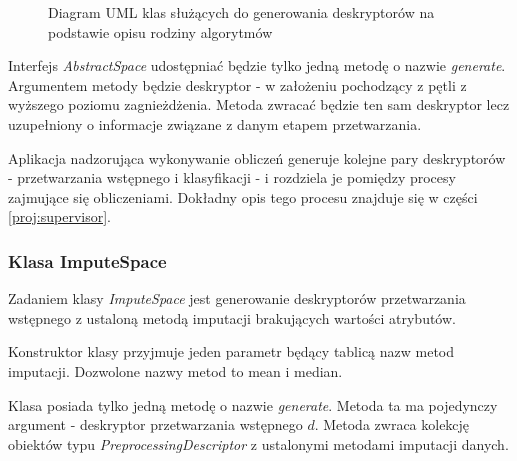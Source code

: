 \documentclass[../thesis.tex]{subfiles}
\begin{document}
\begin{figure}[h]
\centering
{}
\caption{Diagram UML klas służących do generowania deskryptorów na podstawie opisu rodziny algorytmów}
\label{proj:diagram_spaces}
\end{figure}

Interfejs \emph{AbstractSpace} udostępniać będzie tylko jedną metodę o nazwie \emph{generate}. Argumentem metody będzie deskryptor - w założeniu pochodzący z pętli z wyższego poziomu zagnieżdżenia. Metoda zwracać będzie ten sam deskryptor lecz uzupełniony o informacje związane z danym etapem przetwarzania.

Aplikacja nadzorująca wykonywanie obliczeń generuje kolejne pary deskryptorów - przetwarzania wstępnego i klasyfikacji - i rozdziela je pomiędzy procesy zajmujące się obliczeniami. Dokładny opis tego procesu znajduje się w części \ref{proj:supervisor}.

\subsubsection{Klasa ImputeSpace}

Zadaniem klasy \emph{ImputeSpace} jest generowanie deskryptorów przetwarzania wstępnego z ustaloną metodą imputacji brakujących wartości atrybutów. 

Konstruktor klasy przyjmuje jeden parametr będący tablicą nazw metod imputacji. Dozwolone nazwy metod to mean i median. 

Klasa posiada tylko jedną metodę o nazwie \emph{generate}. Metoda ta ma pojedynczy argument - deskryptor przetwarzania wstępnego $d$. Metoda zwraca kolekcję obiektów typu \emph{PreprocessingDescriptor} z ustalonymi metodami imputacji danych.
\end{document}
